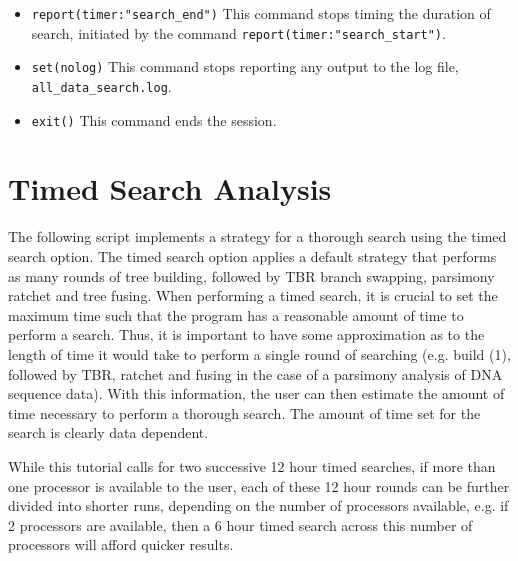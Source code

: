 \begin{itemize}
{graphconsensus,"all\_trees\_diag.txt",diagnosis)} This command
produces a series of outputs of the results of the search. It
includes a file containing best trees in parenthetical notation
(\texttt{all\_trees.tre}) and their costs (\texttt{trees:(total)}),
a graphical representation (in PDF format) of the strict consensus
(\texttt{all\_trees\_cs.pdf}), and the diagnoses for all best trees
(\texttt{all\_trees\_diag.txt}).  
\item \texttt{report(timer:"search\_end")} This command stops timing the
duration of search, initiated by the command \texttt{report(timer:"search\_start")}.  
\item \texttt{set(nolog)} This command stops reporting any output to the log file,
\texttt{all\_data\_search.log}.  
\item \texttt{exit()} This command ends the \poy session.  
\end{itemize}



\section {Timed Search Analysis}{\label {tutorial2}}

The following script implements a strategy for a thorough search
using the timed search option.  The timed search option applies a
default strategy that performs as many rounds of tree building,
followed by TBR branch swapping, parsimony ratchet and tree fusing.
When performing a timed search, it is crucial to set the maximum
time such that the program has a reasonable amount of time to perform
a search.  Thus, it is important to have some approximation as to
the length of time it would take to perform a single round of
searching (e.g. build (1), followed by TBR, ratchet and fusing in
the case of a parsimony analysis of DNA sequence data).  With this
information, the user can then estimate the amount of time necessary
to perform a thorough search. The amount of time set for the search
is clearly data dependent.

While this tutorial calls for two successive 12 hour timed searches,
if more than one processor is available to the user, each of these
12 hour rounds can be further divided into shorter runs, depending
on the number of processors available, e.g. if 2 processors are
available, then a 6 hour timed search across this number of processors
will afford quicker results.


